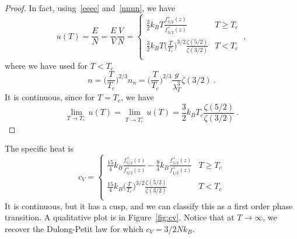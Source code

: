     \begin{proof}
        In fact, using~\eqref{eeee} and~\eqref{nnnn}, we have 
        \begin{equation*}
            u(T) = \frac{E}{N} = \frac{E}{V} \frac{V}{N} = \begin{cases}
                \frac{3}{2} k_B T \frac{f^+_{5/2} (z)}{f^+_{3/2} (z)} & T \geq T_c \\
                \frac{3}{2} k_B T \Big ( \frac{T}{T_c} \Big)^{3/2} \frac{\zeta(5/2)}{\zeta(3/2)} & T < T_c \\
            \end{cases} ~,
        \end{equation*}
        where we have used for $T < T_c$
        \begin{equation*}
            n = \Big ( \frac{T}{T_c} \Big)^{2/3} n_n = \Big ( \frac{T}{T_c} \Big)^{2/3} \frac{g}{\lambda_T^3} \zeta(3/2) ~.
        \end{equation*}
        It is continuous, since for $T = T_c$, we have
        \begin{equation*}
            \lim_{T \rightarrow T_c^-} u(T) = \lim_{T \rightarrow T_c^+} u(T) = \frac{3}{2} k_B T_c \frac{\zeta(5/2)}{\zeta(3/2)} ~.
        \end{equation*}
    \end{proof}
    The specific heat is 
    \begin{equation*}
        c_V = \begin{cases}
            \frac{15}{4} k_B \frac{f^+_{5/2} (z)}{f^+_{3/2} (z)} - \frac{9}{4} k_B \frac{f^+_{3/2} (z)}{f^+_{1/2} (z)} & T \geq T_c \\
            \frac{15}{4} k_B \Big (\frac{T}{T_c} \Big )^{3/2} \frac{\zeta (5/2)}{\zeta (3/2)} & T < T_c \\
        \end{cases}
    \end{equation*}
    It is continuous, but it has a cusp, and we can classify this as a first order phase transition. A qualitative plot is in Figure~\eqref{fig:cv}. Notice that at $T \rightarrow \infty$, we recover the Dulong-Petit law for which $c_V = 3/2 N k_B$.
